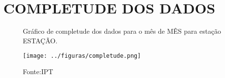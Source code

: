 \section{COMPLETUDE DOS DADOS}

\label{fig:completude}
\begin{figure}[htb!]
    \centering
	\captionsetup{justification=raggedright, singlelinecheck=false, width=1\textwidth}
    \caption{Gráfico de completude dos dados para o mês de MÊS para estação ESTAÇÃO.}
    \texttt{[image: ../figuras/completude.png]} %
    \caption*{Fonte:IPT}
	\label{fig:completude}
\end{figure}

